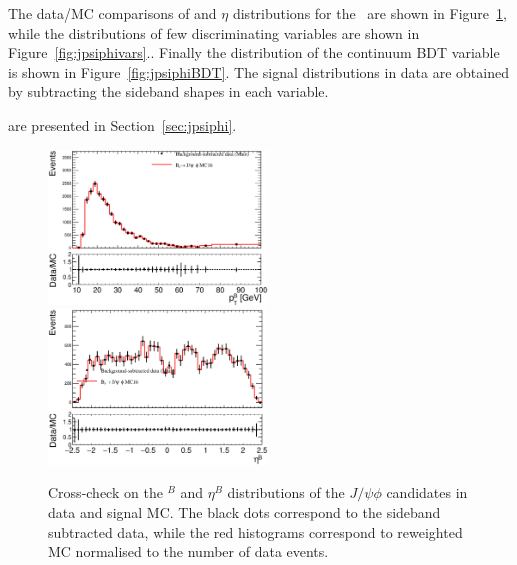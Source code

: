 The data/MC comparisons of \pt{} and $\eta{}$ distributions for the \Bs\ are
shown in Figure~\ref{fig:xcheckcompBs}, while the distributions of few
discriminating variables are shown in Figure~\ref{fig:jpsiphivars}..
Finally the distribution of the continuum BDT variable is shown in
Figure~\ref{fig:jpsiphiBDT}.
The signal distributions in data are obtained by subtracting the
sideband shapes in each variable.

 \BsJpsiPhi are presented in Section~\ref{sec:jpsiphi}.

\begin{figure}[!htb]
\begin{center}
\hspace*{-0.6cm}
\includegraphics[width=0.52\textwidth]{figures/InternalNote_DataMCComparison/Bs/bsjpsiphi_pT.eps}
\hspace*{-0.6cm}
\includegraphics[width=0.52\textwidth]{figures/InternalNote_DataMCComparison/Bs/bsjpsiphi_eta.eps}
\caption{Cross-check on the \pt$^B$ and $\eta^B$ distributions of
the $J/\psi \phi$ candidates in data and signal MC.
The black dots correspond to the sideband subtracted data, while 
the red histograms correspond to reweighted MC 
normalised to the number of data events.}
\label{fig:xcheckcompBs}
\end{center}
\end{figure}
%
